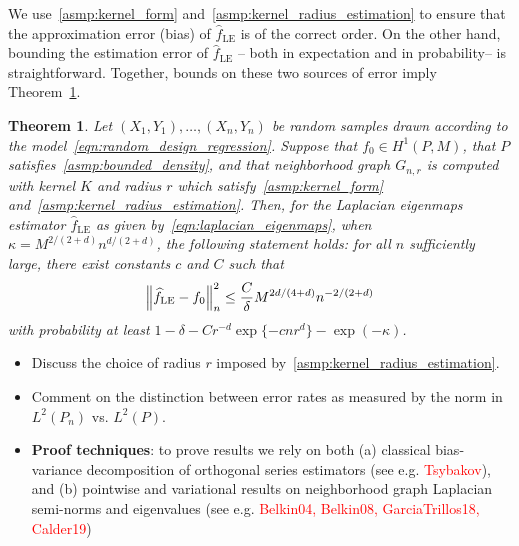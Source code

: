 \documentclass{article}
\newcommand{\1}{\mathbf{1}}
\newcommand{\wh}[1]{\widehat{#1}}
\newcommand{\LE}{\mathrm{LE}}
\theoremstyle{alden}
\theoremstyle{aldenthm}
\newtheorem{theorem}{Theorem}
\theoremstyle{definition}
\theoremstyle{remark}
\begin{document}
We use~\ref{asmp:kernel_form} and~\ref{asmp:kernel_radius_estimation} to ensure that the approximation error (bias) of $\wh{f}_{\LE}$ is of the correct order. On the other hand, bounding the estimation error of $\wh{f}_{\LE}$ -- both in expectation and in probability-- is straightforward. Together, bounds on these two sources of error imply Theorem~\ref{thm:laplacian_eigenmaps_estimation1}.
\begin{theorem}
	\label{thm:laplacian_eigenmaps_estimation1}
	Let $(X_1,Y_1),\ldots,(X_n,Y_n)$ be random samples drawn according to the model~\eqref{eqn:random_design_regression}. Suppose that $f_0 \in H^1(P,M)$, that $P$ satisfies~\ref{asmp:bounded_density}, and that neighborhood graph $G_{n,r}$ is computed with kernel $K$ and radius $r$ which satisfy~\ref{asmp:kernel_form} and~\ref{asmp:kernel_radius_estimation}. Then, for the Laplacian eigenmaps estimator $\wh{f}_{\LE}$ as given by~\eqref{eqn:laplacian_eigenmaps}, when $\kappa = M^{2/(2 + d)}n^{d/(2 + d)}$, the following statement holds: for all $n$ sufficiently large, there exist constants $c$ and $C$ such that
	\begin{equation*}
	\Bigl\|\wh{f}_{\LE} - f_0\Bigr\|_n^2 \leq \frac{C}{\delta} M^{2d/(4 + d)} n^{-2/(2 + d)}
	\end{equation*}
	with probability at least $1 - \delta -  Cr^{-d}\exp\{-cnr^d\} - \exp(-\kappa)$.
\end{theorem}

\begin{itemize}
	\item Discuss the choice of radius $r$ imposed by~\ref{asmp:kernel_radius_estimation}.
	\item Comment on the distinction between error rates as measured by the norm in $L^2(P_n)$ vs. $L^2(P)$.
	\item \textbf{Proof techniques}: to prove results we rely on both (a) classical bias-variance decomposition of orthogonal series estimators (see e.g. \textcolor{red}{Tsybakov}), and (b) pointwise and variational results on neighborhood graph Laplacian semi-norms and eigenvalues (see e.g. \textcolor{red}{Belkin04, Belkin08, GarciaTrillos18, Calder19})
\end{itemize}
\end{document}
